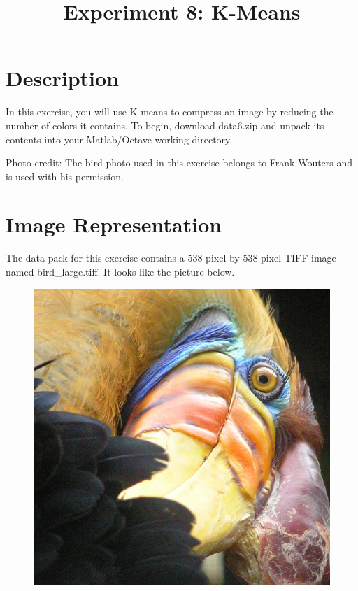 \documentclass[10pt,a4paper]{article}
\begin{document}
\title{Experiment 8: K-Means}

\maketitle
  
\section{Description}
%
  In this exercise, you will use K-means to compress an image by reducing the number of colors it contains. To begin, download \textsf{data6.zip} and unpack its contents into your Matlab/Octave working directory.

  Photo credit: The bird photo used in this exercise belongs to Frank Wouters and is used with his permission.
  


\section{Image Representation}
%
  The data pack for this exercise contains a 538-pixel by 538-pixel TIFF image named \textsf{bird\_large.tiff}. It looks like the picture below.
  \begin{figure}[htb!]
    \centering
      \includegraphics[width=.7\columnwidth]{bird_large}
  \end{figure}
  
\end{document}
